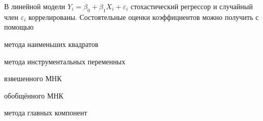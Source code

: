 
\begin{question}
В линейной модели \(Y_i = \beta_0 + \beta_1 X_i + \varepsilon_i\)
стохастический регрессор и случайный член \(\varepsilon_i\)
коррелированы. Состоятельные оценки коэффициентов можно получить с
помощью
\begin{answerlist}
  \item метода наименьших квадратов
  \item метода инструментальных переменных
  \item взвешенного МНК
  \item обобщённого МНК
  \item метода главных компонент
\end{answerlist}
\end{question}


